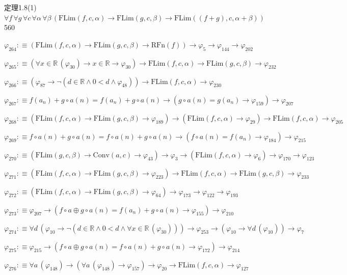 \begin{fullproof}{定理1.8(1)}{$\forall f\,\forall g\,\forall c\,\forall \alpha\,\forall \beta\,(\mathrm{FLim}(f,c,\alpha) \to \mathrm{FLim}(g,c,\beta) \to \mathrm{FLim}((f + g),c,\alpha + \beta))$}{560}
\begin{abbrevlist}
\item $\varphi_{264} :\equiv (\mathrm{FLim}(f,c,\alpha) \to \mathrm{FLim}(g,c,\beta) \to \mathrm{RFn}(f)) \to \varphi_{5} \to \varphi_{144} \to \varphi_{202}$
\item $\varphi_{265} :\equiv (\forall x \in \mathbb{R}\,(\varphi_{30}) \to x \in \mathbb{R} \to \varphi_{30}) \to \mathrm{FLim}(f,c,\alpha) \to \mathrm{FLim}(g,c,\beta) \to \varphi_{232}$
\item $\varphi_{266} :\equiv (\varphi_{87} \to \neg (d \in \mathbb{R} \land 0 < d \land \varphi_{48})) \to \mathrm{FLim}(f,c,\alpha) \to \varphi_{230}$
\item $\varphi_{267} :\equiv f(a_{n}) + g \circ a(n) = f(a_{n}) + g \circ a(n) \to (g \circ a(n) = g(a_{n}) \to \varphi_{159}) \to \varphi_{207}$
\item $\varphi_{268} :\equiv (\mathrm{FLim}(f,c,\alpha) \to \mathrm{FLim}(g,c,\beta) \to \varphi_{189}) \to (\mathrm{FLim}(f,c,\alpha) \to \varphi_{29}) \to \mathrm{FLim}(f,c,\alpha) \to \varphi_{205}$
\item $\varphi_{269} :\equiv f \circ a(n) + g \circ a(n) = f \circ a(n) + g \circ a(n) \to (f \circ a(n) = f(a_{n}) \to \varphi_{184}) \to \varphi_{215}$
\item $\varphi_{270} :\equiv (\mathrm{FLim}(g,c,\beta) \to \mathrm{Conv}(a,c) \to \varphi_{43}) \to \varphi_{3} \to (\mathrm{FLim}(f,c,\alpha) \to \varphi_{6}) \to \varphi_{170} \to \varphi_{123}$
\item $\varphi_{271} :\equiv (\mathrm{FLim}(f,c,\alpha) \to \mathrm{FLim}(g,c,\beta) \to \varphi_{223}) \to \mathrm{FLim}(f,c,\alpha) \to \mathrm{FLim}(g,c,\beta) \to \varphi_{233}$
\item $\varphi_{272} :\equiv (\mathrm{FLim}(f,c,\alpha) \to \mathrm{FLim}(g,c,\beta) \to \varphi_{64}) \to \varphi_{173} \to \varphi_{122} \to \varphi_{193}$
\item $\varphi_{273} :\equiv \varphi_{207} \to (f \circ a \oplus g \circ a(n) = f(a_{n}) + g \circ a(n) \to \varphi_{155}) \to \varphi_{210}$
\item $\varphi_{274} :\equiv \forall d\,(\varphi_{10} \to \neg (d \in \mathbb{R} \land 0 < d \land \forall x \in \mathbb{R}\,(\varphi_{30}))) \to \varphi_{253} \to (\varphi_{10} \to \forall d\,(\varphi_{10})) \to \varphi_{7}$
\item $\varphi_{275} :\equiv \varphi_{215} \to (f \circ a \oplus g \circ a(n) = f \circ a(n) + g \circ a(n) \to \varphi_{172}) \to \varphi_{214}$
\item $\varphi_{276} :\equiv \forall a\,(\varphi_{148}) \to (\forall a\,(\varphi_{148}) \to \varphi_{157}) \to \varphi_{20} \to \mathrm{FLim}(f,c,\alpha) \to \varphi_{127}$

\end{abbrevlist}
\end{fullproof}
